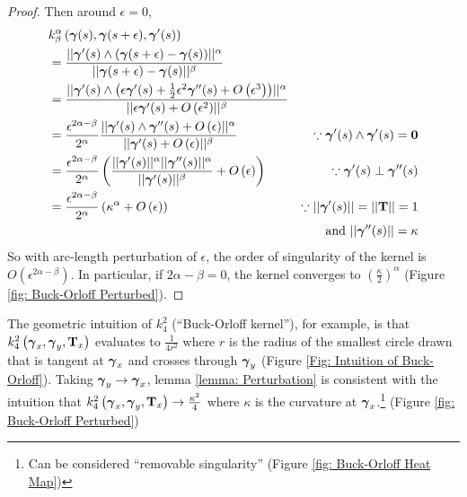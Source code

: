 \documentclass[../dissertation.tex]{subfiles}
\begin{document}
\begin{lemma}
\begin{proof}
        Then around $\epsilon = 0$,
        \begin{align*}
            & k_{\beta}^{\alpha} \left( \boldsymbol{\gamma}(s), \boldsymbol{\gamma}(s + \epsilon), \boldsymbol{\gamma}'(s) \right)
            \\
            &= 
            \frac{\lvert \lvert \boldsymbol{\gamma}'(s) \wedge \left( \boldsymbol{\gamma}(s+\epsilon) - \boldsymbol{\gamma}(s) \right) \rvert \rvert^{\alpha}}{\lvert \lvert \boldsymbol{\gamma}(s+\epsilon) - \boldsymbol{\gamma}(s) \rvert \rvert^{\beta}} \\
            &= 
            \frac{\lvert \lvert \boldsymbol{\gamma}'(s) \wedge \left( \epsilon \boldsymbol{\gamma}'(s) + \frac{1}{2} \epsilon^2 \boldsymbol{\gamma}''(s) + O\left( \epsilon^3 \right) \right) \rvert \rvert^{\alpha}}{\lvert \lvert \epsilon \boldsymbol{\gamma}'(s) + O \left( \epsilon^2 \right) \rvert \rvert^{\beta}} \\
            &=
            \frac{\epsilon^{2\alpha - \beta}}{2^{\alpha}}
            \frac{\lvert \lvert \boldsymbol{\gamma}'(s) \wedge \boldsymbol{\gamma}''(s) + O\left( \epsilon \right) \rvert \rvert^{\alpha}}{\lvert \lvert \boldsymbol{\gamma}'(s) + O \left( \epsilon \right) \rvert \rvert^{\beta}}
            &
            \because \boldsymbol{\gamma}'(s) \wedge \boldsymbol{\gamma}'(s) = \mathbf{0}
            \\
            &= 
            \frac{\epsilon^{2\alpha - \beta}}{2^{\alpha}}
            \left( \frac{\lvert \lvert \boldsymbol{\gamma}'(s) \rvert \rvert^{\alpha}\lvert \lvert \boldsymbol{\gamma}''(s) \rvert \rvert^{\alpha}}{\lvert \lvert \boldsymbol{\gamma}'(s) \rvert \rvert^{\beta}} + O \left( \epsilon \right) \right)
            &
            \because \boldsymbol{\gamma}'(s) \perp \boldsymbol{\gamma}''(s)
            \\
            &= 
            \frac{\epsilon^{2\alpha - \beta}}{2^{\alpha}}
            \left( \kappa^{\alpha} + O \left( \epsilon \right) \right)
            &
            \because \lvert \lvert \boldsymbol{\gamma}'(s) \rvert \rvert = \lvert \lvert \mathbf{T} \rvert \rvert=1
            \\
            &&\text{and } \lvert \lvert \boldsymbol{\gamma}''(s) \rvert \rvert = \kappa
        \end{align*}
        So with arc-length perturbation of $\epsilon$, the order of singularity of the kernel is $O \left( \epsilon^{2\alpha - \beta} \right)$. In particular, if $2\alpha - \beta = 0$, the kernel converges to $\left( \frac{\kappa}{2} \right)^{\alpha}$
        (Figure \ref{fig: Buck-Orloff Perturbed}).
    \end{proof}
\end{lemma}
\begin{remark}
    The geometric intuition of $k_{4}^2$ (``Buck-Orloff kernel''), for example, is that $k_{4}^{2} \left( \boldsymbol{\gamma}_x, \boldsymbol{\gamma}_y, \mathbf{T}_x \right)$ evaluates to $\frac{1}{4r^2}$ where $r$ is the radius of the smallest circle drawn that is tangent at $\boldsymbol{\gamma}_x$ and crosses through $\boldsymbol{\gamma}_y$
(Figure \ref{Fig: Intuition of Buck-Orloff}).
Taking $\boldsymbol{\gamma}_y \rightarrow \boldsymbol{\gamma}_x$,
lemma \ref{lemma: Perturbation} is consistent with the intuition that $k_4^2 \left( \boldsymbol{\gamma}_x, \boldsymbol{\gamma}_y, \mathbf{T}_x \right) \rightarrow \frac{\kappa^2}{4}$ where $\kappa$ is the curvature at $\boldsymbol{\gamma}_x$.\footnote{Can be considered ``removable singularity'' (Figure \ref{fig: Buck-Orloff Heat Map})}
(Figure \ref{fig: Buck-Orloff Perturbed})
\end{remark}
\end{document}
